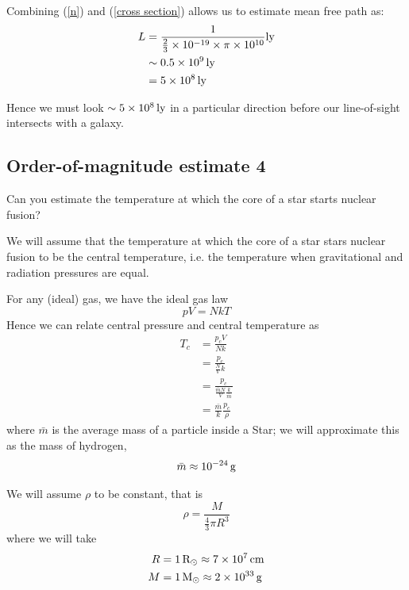 \documentclass[a4paper]{article} %
\begin{document}
Combining (\ref{n}) and (\ref{cross section}) allows us to estimate mean free path as:
\begin{align*}
L&=\frac{1}{\frac{2}{3}\times 10^{-19}\times \pi\times 10^{10}}\si{ly}\\
&\sim \SI{0.5 d9}{ly}\\
&=\SI{5d8}{ly}
\end{align*}

Hence we must look $\sim\SI{5d8}{ly}$ in a particular direction before our line-of-sight intersects with a galaxy.

\pagebreak

\subsection{Order-of-magnitude estimate 4}
\begin{framed}
Can you estimate the temperature at which the core of a star starts nuclear fusion?
\end{framed}

We will assume that the temperature at which the core of a star stars nuclear fusion to be the central temperature, i.e. the temperature when gravitational and radiation pressures are equal.

For any (ideal) gas, we have the ideal gas law
\begin{equation}
pV=NkT
\end{equation}
Hence we can relate central pressure and central temperature as
\begin{align}
T_c&=\frac{p_c V}{Nk}\nonumber\\
&=\frac{p_c}{\frac{N}{V}k}\nonumber\\
&=\frac{p_c}{\frac{\bar{m}N}{V}\frac{k}{\bar{m}}}\nonumber\\
&=\frac{\bar{m}}{k}\frac{p_c}{\rho}\label{T_c with p}
\end{align}
where $\bar{m}$ is the average mass of a particle inside a Star; we will approximate this as the mass of hydrogen,
\begin{equation*}
\bar{m}\approx\SI{d-24}{g}
\end{equation*}

We will assume $\rho$ to be constant, that is
\begin{equation*}
\rho=\frac{M}{\frac{4}{3}\pi R^3}
\end{equation*}
where we will take
\begin{align*}
R&=\SI{1}{R_\odot}\approx \SI{7d7}{cm}\\
M&=\SI{1}{M_\odot}\approx \SI{2d33}{g}
\end{align*}
\end{document}
